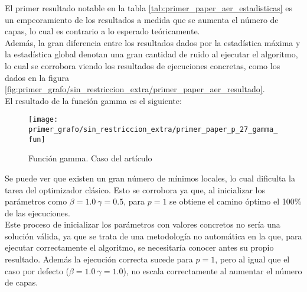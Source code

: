 \documentclass{article}
\begin{document}
El primer resultado notable en la tabla \ref{tab:primer_paper_aer_estadisticas} es un empeoramiento de los resultados a medida que se aumenta el número de capas, lo cual es contrario a lo esperado teóricamente. \\
Además, la gran diferencia entre los resultados dados por la estadística máxima y la estadística global denotan una gran cantidad de ruido al ejecutar el algoritmo, lo cual se corrobora viendo los resultados de ejecuciones concretas, como los dados en la figura \ref{fig:primer_grafo/sin_restriccion_extra/primer_paper_aer_resultado}. \\

El resultado de la función gamma es el siguiente:  %
\begin{figure}[htbp]
  \centering
  \texttt{[image: primer\_grafo/sin\_restriccion\_extra/primer\_paper\_p\_27\_gamma\_fun]}
  \caption{Función gamma. Caso del artículo}
  \label{fig:primer_grafo/sin_restriccion_extra/primer_paper_p_27_gamma_fun}
\end{figure}

Se puede ver que existen un gran número de mínimos locales, lo cual dificulta la tarea del optimizador clásico. Esto se corrobora ya que, al inicializar los parámetros como \(\beta = 1.0 \ \gamma = 0.5\), para \(p = 1\) se obtiene el camino óptimo el 100\% de las ejecuciones. \\
Este proceso de inicializar los parámetros con valores concretos no sería una solución válida, ya que se trata de una metodología no automática en la que, para ejecutar correctamente el algoritmo, se necesitaría conocer antes su propio resultado. Además la ejecución correcta sucede para \(p = 1\), pero al igual que el caso por defecto (\(\beta = 1.0 \ \gamma = 1.0\)), no escala correctamente al aumentar el número de capas.
\end{document}
